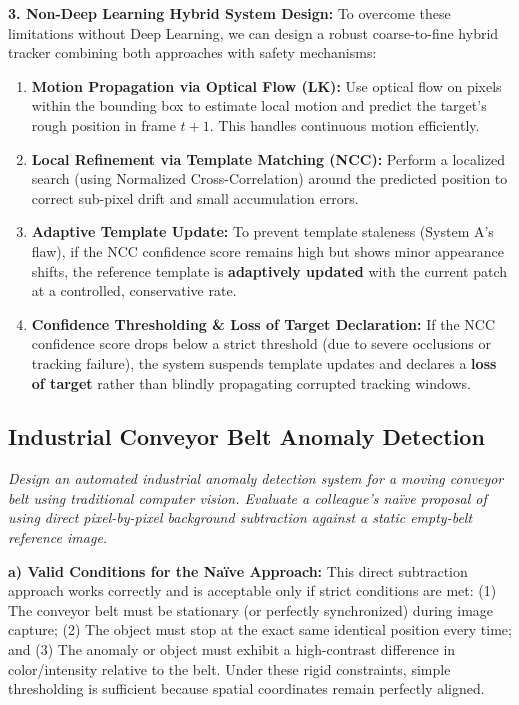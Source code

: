 \textbf{3. Non-Deep Learning Hybrid System Design:}
To overcome these limitations without Deep Learning, we can design a robust coarse-to-fine hybrid tracker combining both approaches with safety mechanisms:
\begin{enumerate}
    \item \textbf{Motion Propagation via Optical Flow (LK):} Use optical flow on pixels within the bounding box to estimate local motion and predict the target's rough position in frame $t+1$. This handles continuous motion efficiently.
    \item \textbf{Local Refinement via Template Matching (NCC):} Perform a localized search (using Normalized Cross-Correlation) around the predicted position to correct sub-pixel drift and small accumulation errors.
    \item \textbf{Adaptive Template Update:} To prevent template staleness (System A's flaw), if the NCC confidence score remains high but shows minor appearance shifts, the reference template is \textbf{adaptively updated} with the current patch at a controlled, conservative rate.
    \item \textbf{Confidence Thresholding \& Loss of Target Declaration:} If the NCC confidence score drops below a strict threshold (due to severe occlusions or tracking failure), the system suspends template updates and declares a \textbf{loss of target} rather than blindly propagating corrupted tracking windows.
\end{enumerate}

\subsection[Question -- {\it Industrial Conveyor Belt Anomaly Detection}]{}

\subsection{Industrial Conveyor Belt Anomaly Detection}
\textit{Design an automated industrial anomaly detection system for a moving conveyor belt using traditional computer vision. Evaluate a colleague's naïve proposal of using direct pixel-by-pixel background subtraction against a static empty-belt reference image.}

\textbf{a) Valid Conditions for the Naïve Approach:}
This direct subtraction approach works correctly and is acceptable only if strict conditions are met:
(1) The conveyor belt must be stationary (or perfectly synchronized) during image capture;
(2) The object must stop at the exact same identical position every time; and
(3) The anomaly or object must exhibit a high-contrast difference in color/intensity relative to the belt. Under these rigid constraints, simple thresholding is sufficient because spatial coordinates remain perfectly aligned.

